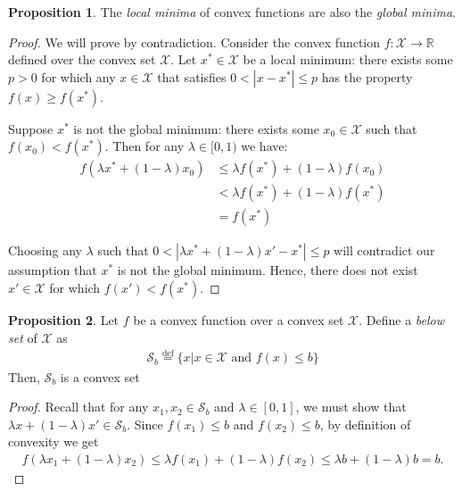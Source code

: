 \documentclass[a4paper,12pt]{article}
\theoremstyle{definition}
\newtheorem*{proposition}{Proposition}
\newcommand{\R}{\mathbb{R}}
\begin{document}
\begin{proposition}
    The \emph{local minima} of convex functions are also the \emph{global minima}.
    \begin{proof}
        We will prove by contradiction.
        Consider the convex function $f: \mathcal{X} \to \R$ defined over the convex set $\mathcal{X}$.
        Let $x^{\ast} \in \mathcal{X}$ be a local minimum: there exists some $p > 0$ for which any
        $x \in \mathcal{X}$ that satisfies $0 < |x - x^{\ast}| \leq p$ has the property $f(x) \geq f(x^*)$.

        Suppose $x^{\ast}$ is not the global minimum: there exists some $x_0 \in \mathcal{X}$ such that
        $f(x_0) < f(x^{\ast})$.
        Then for any $\lambda \in [0, 1)$ we have:
        \begin{align*}
            f(\lambda x^\ast+ (1- \lambda)x_0) & \leq \lambda f(x^\ast)+(1-\lambda)f(x_0) \\
                                & < \lambda f(x^\ast)+(1-\lambda)f(x^\ast) \\
                                & = f(x^\ast)
        \end{align*}

        Choosing any $\lambda$ such that $0 < |\lambda x^{\ast} + (1-\lambda) x' - x^{\ast}| \leq p$ will contradict 
        our assumption that $x^{\ast}$ is not the global minimum. Hence, there does not exist $x' \in \mathcal{X}$ for
        which $f(x') < f(x^{\ast})$.
    \end{proof}
\end{proposition}

\begin{proposition}
    Let $f$ be a convex function over a convex set $\mathcal{X}$. Define a \emph{below set} of $\mathcal{X}$ as
    \begin{align*}
        \mathcal{S}_b \stackrel{\mathrm{def}}{=} \{x | x \in \mathcal{X} \text{ and } f(x) \leq b\}
    \end{align*}
    Then, $\mathcal{S}_b$ is a convex set
    \begin{proof}
        Recall that for any $x_1, x_2 \in \mathcal{S}_b$ and $\lambda \in [0, 1]$, we must show that $\lambda x + (1-\lambda) x' \in \mathcal{S}_b$.
        Since $f(x_1) \leq b$ and $f(x_2) \leq b$, by definition of convexity we get
        \begin{align*}
            f(\lambda x_1 + (1-\lambda) x_2) \leq \lambda f(x_1) + (1-\lambda) f(x_2) \leq \lambda b + (1-\lambda) b = b.
        \end{align*}
    \end{proof}
\end{proposition}
\end{document}
